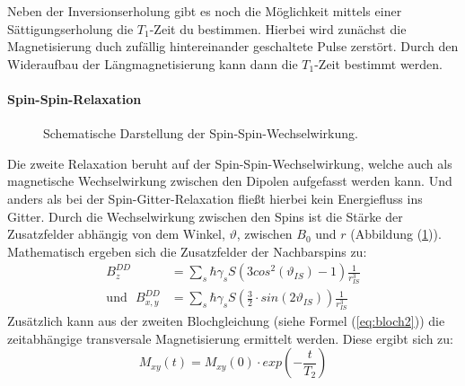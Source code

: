 Neben der Inversionserholung gibt es noch die M\"{o}glichkeit mittels einer S\"{a}ttigungs{\-}erhol{\-}ung die $T_1$-Zeit du bestimmen.
Hierbei wird zun\"{a}chst die Magnetisierung duch zuf\"{a}llig hintereinander geschaltete Pulse zerst\"{o}rt.
Durch den Wideraufbau der L\"{a}ngmagnetisierung kann dann die $T_1$-Zeit bestimmt werden.

\paragraph{Spin-Spin-Relaxation}
\begin{figure}
	\centering
	\vspace{-10pt}
	\caption{Schematische Darstellung der Spin-Spin-Wechselwirkung.}
	\label{SpinSpin}
\end{figure}
Die zweite Relaxation be{\-}ruht auf der Spin-Spin-Wechselwirkung, welche auch als magnetische Wechselwirkung zwischen den Dipolen aufgefasst werden kann.
Und anders als bei der Spin-Gitter-Relaxation flie{\ss}t hierbei kein Energiefluss ins Gitter.
Durch die Wechselwirkung zwischen den Spins ist die St\"{a}rke der Zusatzfelder abh\"{a}ngig von dem Winkel, $\vartheta$, zwischen $B_0$ und $r$ (Abbildung (\ref{SpinSpin})).
Mathematisch ergeben sich die Zusatzfelder der Nachbarspins zu:
\begin{align*}
	B_z^{DD} &= \sum_s \hbar \gamma_s S \left( 3 cos^2 \left(\vartheta_{IS}\right) - 1 \right) \frac{1}{r_{IS}^3} \\
	\text{und} \, \, \, \, B_{x,y}^{DD} &= \sum_s \hbar \gamma_s S \left( \frac{3}{2} \cdot sin\left(2 \vartheta_{IS}\right) \right) \frac{1}{r_{IS}^3}
\end{align*}
Zus\"{a}tzlich kann aus der zweiten Blochgleichung (siehe Formel (\ref{eq:bloch2})) die zeitabh\"{a}ngige transversale Magnetisierung ermittelt werden.
Diese ergibt sich zu:
\begin{equation*}
	M_{xy} (t) = M_{xy} (0) \cdot exp \left( - \frac{t}{T_2} \right)
	\label{eq:Mxy}
\end{equation*}

